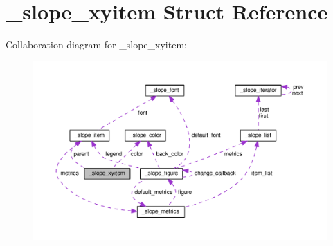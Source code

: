 \hypertarget{struct__slope__xyitem}{\section{\+\_\+slope\+\_\+xyitem Struct Reference}
\label{struct__slope__xyitem}
}


Collaboration diagram for \+\_\+slope\+\_\+xyitem\+:
\nopagebreak
\begin{figure}[H]
\begin{center}
\leavevmode
\includegraphics[width=350pt]{struct__slope__xyitem__coll__graph}
\end{center}
\end{figure}
